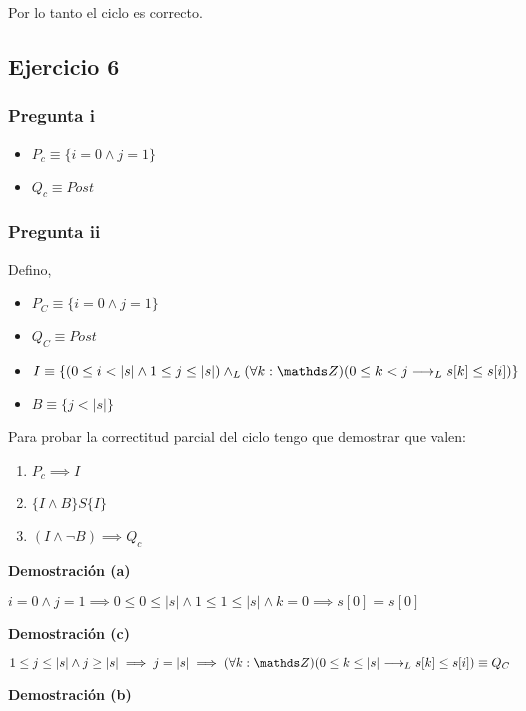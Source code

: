Por lo tanto el ciclo es correcto.

\subsection{Ejercicio 6}

\subsubsection{Pregunta i}

\begin{itemize}
    \item $ P_c \equiv \{ i = 0 \wedge j = 1 \} $
    \item $ Q_c \equiv Post $
\end{itemize}

\subsubsection{Pregunta ii}

Defino,
\begin{itemize}
    \item $ P_C \equiv \{ i = 0 \wedge j = 1 \} $
    \item $ Q_C \equiv Post $
    \item $ I \equiv \{ (0 \leq i < |s| \wedge 1 \leq j \leq |s|) \yLuego (\forall k: \ent)(0 \leq k < j \implicaLuego s[k] \leq s[i]) \} $
    \item $ B \equiv \{ j < |s| \} $
\end{itemize}

Para probar la correctitud parcial del ciclo tengo que demostrar que valen:
\begin{enumerate}[label=(\alph*)]
    \item $ P_c \implies I $
    \item $ \{ I \wedge B \} S \{ I \} $
    \item $ (I \wedge \neg B) \implies Q_c $
\end{enumerate}

\textbf{Demostración (a)}

$ i = 0 \wedge j = 1 \implies 0 \leq 0 \leq |s| \wedge 1 \leq 1 \leq |s| \wedge k = 0 \implies s[0] = s[0] $

\textbf{Demostración (c)}

$ 1 \leq j \leq |s| \wedge j \geq |s| \implies j = |s| \implies (\forall k: \ent)(0 \leq k \leq |s| \implicaLuego s[k] \leq s[i]) \equiv Q_C $

\textbf{Demostración (b)}

